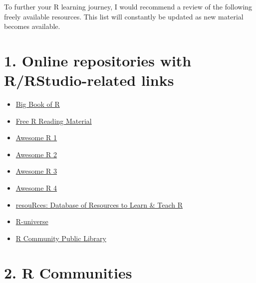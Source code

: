 \documentclass[
  letterpaper,
  DIV=11,
  numbers=noendperiod]{scrreprt}
\providecommand{\tightlist}{%
  \setlength{\itemsep}{0pt}\setlength{\parskip}{0pt}}\usepackage{longtable,booktabs,array}
\begin{document}
To further your R learning journey, I would recommend a review of the
following freely available resources. This list will constantly be
updated as new material becomes available.

\section{1. Online repositories with R/RStudio-related
links}\label{online-repositories-with-rrstudio-related-links}

\begin{itemize}
\tightlist
\item
  \href{https://www.bigbookofr.com/}{Big Book of R}
\item
  \href{https://committedtotape.shinyapps.io/freeR/}{Free R Reading
  Material}
\item
  \href{https://github.com/qinwf/awesome-R}{Awesome R 1}
\item
  \href{https://github.com/uhub/awesome-r}{Awesome R 2}
\item
  \href{https://github.com/ktaranov/AwesomeR}{Awesome R 3}
\item
  \href{https://github.com/iamericfletcher/awesome-r-learning-resources}{Awesome
  R 4}
\item
  \href{https://www.resourcesdatabase.com/}{resouRces: Database of
  Resources to Learn \& Teach R}
\item
  \href{https://r-universe.dev/search/}{R-universe}
\item
  \href{https://rviews.rstudio.com/2021/11/04/bookdown-org/}{R Community
  Public Library}
\end{itemize}

\section{2. R Communities}\label{r-communities}
\end{document}
